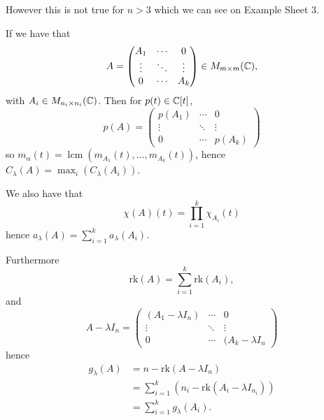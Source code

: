 \documentclass{article}
\newcommand{\rk}{\mathrm{rk}}
\begin{document}
However this is not true for $ n>3 $ which we can see on Example Sheet 3.
\begin{remark}
If we have that
  \[
    A=\begin{pmatrix}
 	A_1 & \cdots & 0 \\
		\vdots & \ddots & \vdots\\
		0 & \cdots & A_k
	\end{pmatrix}\in M_{m\times m}(\mathbb{C}),
  \]
  with $ A_i\in M_{n_i\times n_i}(\mathbb{C}) $. Then for $ p(t)\in \mathbb{C}[t] $,
  \[
    p(A)=\begin{pmatrix}
 	p(A_1) & \cdots & 0 \\
		\vdots & \ddots & \vdots\\
		0 & \cdots & p(A_k)
	\end{pmatrix}
  \]
  so $ m_\alpha(t)=\operatorname{lcm}(m_{A_1}(t),\dots, m_{A_k}(t)) $, hence $ C_\lambda(A)=\max_i(C_\lambda(A_i)) $.\par
  We also have that
  \[
	  \chi(A)(t)=\prod_{i=1}^k\chi_{A_i}(t)
  \]
  hence $ a_\lambda(A)=\sum_{i=1}^ka_\lambda(A_i) $.\par
  Furthermore
  \[
	  \rk(A)=\sum_{i=1}^k\rk(A_i),
  \]
  and
  \[
    A-\lambda I_n=\begin{pmatrix}
	    (A_1-\lambda I_n) & \cdots & 0 \\
	    \vdots & \ddots & \vdots \\
	    0 & \cdots & (A_k-\lambda I_n
    \end{pmatrix}
  \]
  hence
\begin{align*}
	g_\lambda(A) &= n -\rk(A-\lambda I_n)\\
		     &= \sum_{i=1}^k (n_i-\rk(A_i-\lambda I_{n_i}))\\
		     &= \sum_{i=1}^k g_\lambda(A_i).
\end{align*}
\end{remark}
\end{document}
